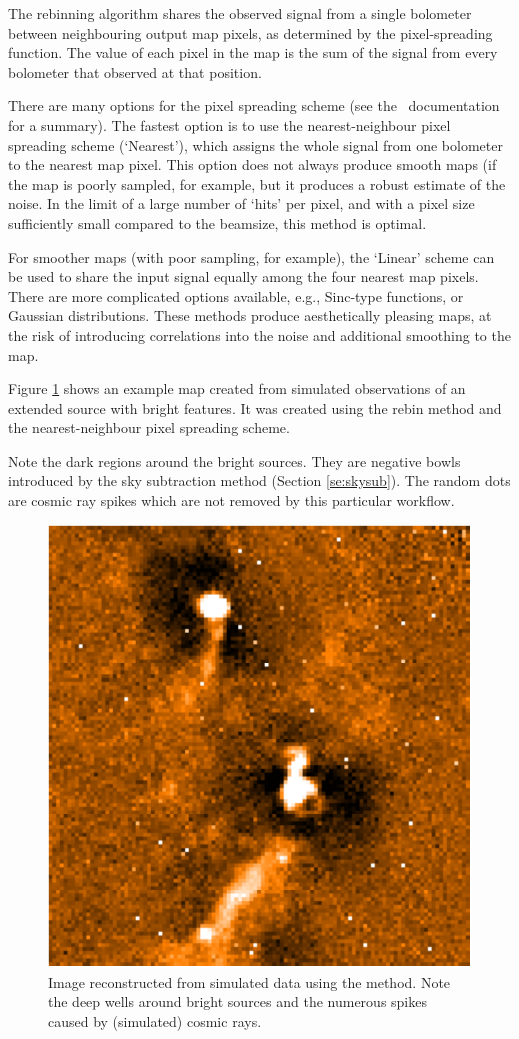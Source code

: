 \documentclass[oneside,11pt]{starlink}
\begin{document}
The rebinning algorithm shares the observed signal from a single
bolometer between neighbouring output map pixels, as determined by the
pixel-spreading function. The value of each pixel in the map is the
sum of the signal from every bolometer that observed at that position.

There are many options for the pixel spreading scheme (see the \wcsmosaic\
documentation for a summary). The fastest option is to use the nearest-neighbour
pixel spreading scheme (`Nearest'), which assigns the whole signal
from one bolometer to the nearest map pixel. This option does not
always produce smooth maps (if the map is poorly sampled, for example,
but it produces a robust estimate of the noise. In the limit of a
large number of `hits' per pixel, and with a pixel size sufficiently
small compared to the beamsize, this method is optimal.

For smoother maps (with poor sampling, for example), the `Linear'
scheme can be used to share the input signal equally among the four
nearest map pixels. There are more complicated options available,
e.g., Sinc-type functions, or Gaussian distributions. These methods
produce aesthetically pleasing maps, at the risk of introducing
correlations into the noise and additional smoothing to the map.

Figure \ref{fig:rebinmap} shows an example map created from simulated
observations of an extended source with bright features. It was
created using the rebin method and the nearest-neighbour pixel
spreading scheme.

Note the dark regions around the bright sources. They are negative
bowls introduced by the sky subtraction method (Section
\ref{se:skysub}). The random dots are cosmic ray spikes which are not
removed by this particular workflow.

\begin{figure}[htb]
  \begin{center}
    \includegraphics[width=0.7\linewidth]{sun258_rebinmap}
    \caption{Image reconstructed from simulated data using the
       method. Note the deep wells around bright
      sources and the numerous spikes caused by (simulated) cosmic
      rays.}
    \label{fig:rebinmap}
  \end{center}
\end{figure}
\end{document}
